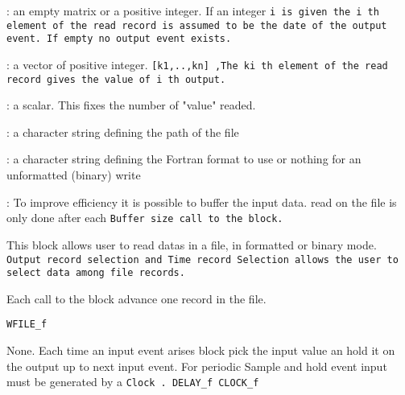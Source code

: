 \begin{scitem}
\item[{\verb?Time record Selection?}]
: an empty matrix or a positive integer. If an integer %
\tt i %
\rm is given
the  %
\tt i%
\rm th element of the read record is assumed to be the date of
the output event. If empty no output event exists.
\item[{\verb?Output record selection?}]
: a vector of positive integer. %
\tt [k1,..,kn]%
\rm ,The %
\tt ki%
\rm th
element of  the read record gives the value of %
\tt i%
\rm th output.
\item[{\verb?size of output?}]
: a scalar. This fixes the number of "value" readed.
\item[{\verb?Input file name?}]
: a character string defining the path of the file 
\item[{\verb?Input Format?}]
: a character string defining the Fortran format to use or nothing for
an unformatted (binary) write
\item[{\verb?Buffer size?}]
: To improve efficiency it is possible to buffer the input data. read
on the file is only done after each %
\tt Buffer size %
\rm call to the block.
\end{scitem}%
This block allows user to read  datas in a file, in formatted or binary
mode. %
\tt Output record selection %
\rm and %
\tt Time record Selection %
\rm allows the user to select data among file records.

Each call to the block advance one record in the file. 

{\verb?WFILE_f?} \pageref{WFILEf}









%
%


\label{SAMPLEHOLDf}

None.
Each time an input event arises block pick the input value an hold it
on the output up to next input event.
For periodic Sample and hold event input must be generated by a %
\tt Clock%
\rm .
{\verb?DELAY_f CLOCK_f?} \pageref{DELAYfCLOCKf}

%
%


